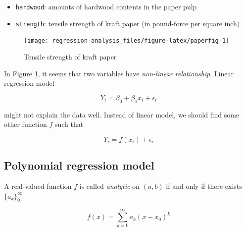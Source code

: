 \documentclass[]{book}
\newenvironment{Shaded}{\begin{snugshade}}{\end{snugshade}}
\newcommand{\DataTypeTok}[1]{\textcolor[rgb]{0.13,0.29,0.53}{#1}}
\newcommand{\KeywordTok}[1]{\textcolor[rgb]{0.13,0.29,0.53}{\textbf{#1}}}
\newcommand{\NormalTok}[1]{#1}
\newcommand{\OperatorTok}[1]{\textcolor[rgb]{0.81,0.36,0.00}{\textbf{#1}}}
\newcommand{\StringTok}[1]{\textcolor[rgb]{0.31,0.60,0.02}{#1}}
\providecommand{\tightlist}{%
  \setlength{\itemsep}{0pt}\setlength{\parskip}{0pt}}
\theoremstyle{definition}
\theoremstyle{definition}
\theoremstyle{definition}
\theoremstyle{remark}
\begin{document}
\begin{itemize}
\tightlist
\item
  \texttt{hardwood}: amounts of hardwood contents in the paper pulp
\item
  \texttt{strength}: tensile strength of kraft paper (in pound-force per square inch)
\end{itemize}

\begin{Shaded}
\end{Shaded}

\begin{figure}[H]

{\centering \texttt{[image: regression-analysis\_files/figure-latex/paperfig-1]} 

}

\caption{Tensile strength of kraft paper}\label{fig:paperfig}
\end{figure}

In Figure \ref{fig:paperfig}, it seems that two variables have \emph{non-linear relationship}. Linear regression model

\[Y_i = \beta_0 + \beta_1 x_i + \epsilon_i\]

might not explain the data well. Instead of linear model, we should find some other function \(f\) such that

\begin{equation}
  Y_i = f(x_i) + \epsilon_i
  \label{eq:nonlin}
\end{equation}

\hypertarget{polynomial-regression-model}{%
\subsection{Polynomial regression model}\label{polynomial-regression-model}}

A real-valued function \(f\) is called \emph{analytic} on \((a, b)\) if and only if there exists \(\{ a_k \}_{0}^{\infty}\)

\[f(x) = \sum_{k = 0}^{\infty} a_k (x - x_0)^k\]
\end{document}

